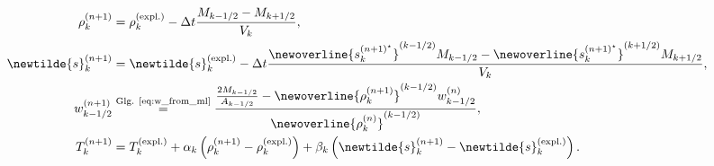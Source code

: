 \begin{align}
\rho^{(n + 1)}_k &= \rho^{(\text{expl.})}_k - \Delta t\frac{M_{k - 1/2} - M_{k + 1/2}}{V_k},\\
\newtilde{s}^{(n + 1)}_k &= \newtilde{s}^{(\text{expl.})}_k - \Delta t\frac{\newoverline{s_k^{(n + 1)^\star}}^{(k - 1/2)}M_{k - 1/2} - \newoverline{s_k^{(n + 1)^\star}}^{(k + 1/2)}M_{k + 1/2}}{V_k},\\
w^{(n + 1)}_{k - 1/2} &\stackrel{\text{Glg. \eqref{eq:w_from_ml}}}{=} \frac{\frac{2M_{k - 1/2}}{A_{k - 1/2}} - \newoverline{\rho_k^{(n + 1)}}^{(k - 1/2)}w^{(n)}_{k - 1/2}}{\newoverline{\rho_k^{(n)}}^{(k - 1/2)}},\\
T^{(n + 1)}_{k} &= T^{(\text{expl.})}_{k} + \alpha_k\left(\rho^{(n + 1)}_k  - \rho^{(\text{expl.})}_k\right) + \beta_k\left(\newtilde{s}^{(n + 1)}_k - \newtilde{s}^{(\text{expl.})}_k\right).
\end{align}

